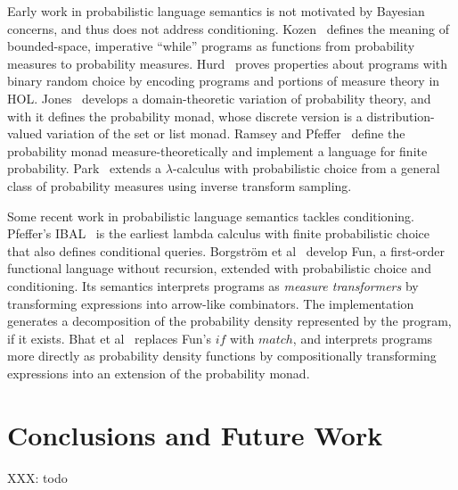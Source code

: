\documentclass{llncs}
\begin{document}
Early work in probabilistic language semantics is not motivated by Bayesian concerns, and thus does not address conditioning.
Kozen~\cite{cit:kozen-1979fcs-prob-programs-short} defines the meaning of bounded-space, imperative ``while'' programs as functions from probability measures to probability measures.
Hurd~\cite{cit:hurd-2002thesis} proves properties about programs with binary random choice by encoding programs and portions of measure theory in HOL.
Jones~\cite{cit:jones-1990thesis} develops a domain-theoretic variation of probability theory, and with it defines the probability monad, whose discrete version is a distribution-valued variation of the set or list monad.
Ramsey and Pfeffer~\cite{cit:ramsey-2002popl-stochastic-short} define the probability monad measure-theoretically and implement a language for finite probability.
Park~\cite{cit:park-2008toplas-prob} extends a $\lambda$-calculus with probabilistic choice from a general class of probability measures using inverse transform sampling.

Some recent work in probabilistic language semantics tackles conditioning. Pfeffer's IBAL~\cite{cit:pfeffer-2007chapter-ibal} is the earliest lambda calculus with finite probabilistic choice that also defines conditional queries.
Borgstr\"om et al~\cite{cit:borgstrom-2011esop-measure-transformer} develop Fun, a first-order functional language without recursion, extended with probabilistic choice and conditioning.
Its semantics interprets programs as \emph{measure transformers} by transforming expressions into arrow-like combinators.
The implementation generates a decomposition of the probability density represented by the program, if it exists.
Bhat et al~\cite{cit:bhat-2013etaps-densities} replaces Fun's $if$ with $match$, and interprets programs more directly as probability density functions by compositionally transforming expressions into an extension of the probability monad.



\section{Conclusions and Future Work}

XXX: todo
\end{document}
